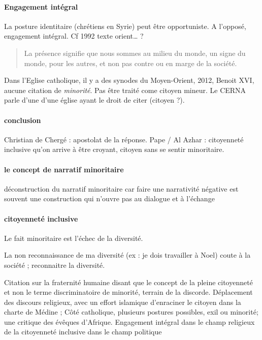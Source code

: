 \paragraph{Engagement intégral} La posture identitaire (chrétiens en Syrie) peut être opportuniste.   A l’opposé, engagement intégral. Cf 1992 texte orient… ? 
\begin{quote}
La présence signifie que nous sommes au milieu du monde, un signe du monde, pour les autres, et non pas contre ou en marge de la société.
\end{quote}

Dans l’Eglise catholique, il y a des synodes du Moyen-Orient, 2012, Benoit XVI, aucune citation de \textit{minorité}. Pas être traité come citoyen mineur.
Le CERNA parle d’une d’une église ayant le droit de citer (citoyen ?).

\paragraph{conclusion}
Christian de Chergé : apostolat de la réponse. 
Pape / Al Azhar : citoyenneté inclusive qu’on arrive à être croyant, citoyen sans se sentir minoritaire.

\paragraph{le concept de narratif minoritaire}  déconstruction du narratif minoritaire car faire une narrativité négative est souvent une construction qui n’ouvre pas au dialogue et à l’échange 
\paragraph{citoyenneté inclusive} Le fait minoritaire est l’échec de la diversité. 
\begin{Ex}
La non reconnaissance de ma diversité (ex : je dois travailler à Noel)  coute à la société ; reconnaitre la diversité.  
\end{Ex}

\begin{Synthesis}
Citation sur la fraternité humaine disant que le concept de la pleine citoyenneté et non le terme discriminatoire de minorité, terrain de la discorde. Déplacement des discours religieux, avec un effort islamique d’enraciner le citoyen dans la charte de Médine ; Côté catholique, plusieurs postures possibles, exil ou minorité; une critique des évêques d’Afrique.
Engagement intégral dans le champ religieux de la citoyenneté inclusive dans le champ politique
\end{Synthesis}
